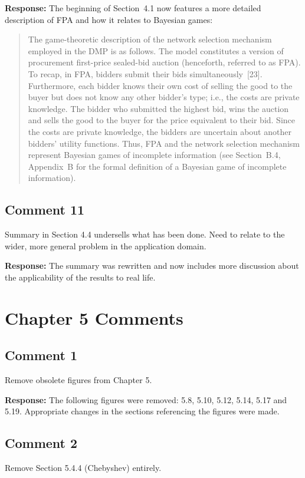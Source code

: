 \documentclass[10pt,a4paper,notitlepage]{article}
\numberwithin{equation}{section}
\begin{document}
\textbf{Response:}
The beginning of Section~4.1 now features a more detailed description of FPA and how it relates to Bayesian games:
\begin{quote}
The game-theoretic description of the network selection mechanism employed in the DMP is as follows. The model constitutes a version of procurement first-price sealed-bid auction (henceforth, referred to as FPA). To recap, in FPA, bidders submit their bids simultaneously~[23]. Furthermore, each bidder knows their own cost of selling the good to the buyer but does not know any other bidder's type; i.e., the costs are private knowledge. The bidder who submitted the highest bid, wins the auction and sells the good to the buyer for the price equivalent to their bid. Since the costs are private knowledge, the bidders are uncertain about another bidders' utility functions. Thus, FPA and the network selection mechanism represent Bayesian games of incomplete information (see Section~B.4, Appendix~B for the formal definition of a Bayesian game of incomplete information).
\end{quote}

\subsection{Comment 11}
Summary in Section 4.4 undersells what has been done. Need to relate to the wider, more general problem in the application domain.

\textbf{Response:}
The summary was rewritten and now includes more discussion about the applicability of the results to real life.

\clearpage

\section{Chapter 5 Comments}
\subsection{Comment 1}
Remove obsolete figures from Chapter 5.

\textbf{Response:}
The following figures were removed: 5.8, 5.10, 5.12, 5.14, 5.17 and 5.19. Appropriate changes in the sections referencing the figures were made.

\subsection{Comment 2}
Remove Section 5.4.4 (Chebyshev) entirely.
\end{document}
